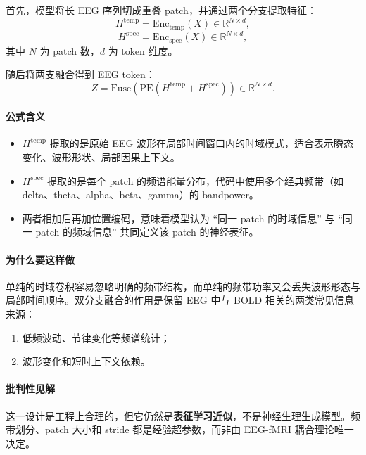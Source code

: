 \documentclass[11pt,a4paper]{ctexart}
\newcommand{\R}{\mathbb{R}}
\begin{document}
首先，模型将长 EEG 序列切成重叠 patch，并通过两个分支提取特征：
\begin{equation}
H^{\mathrm{temp}} = \mathrm{Enc}_{\mathrm{temp}}(X) \in \R^{N \times d},
\end{equation}
\begin{equation}
H^{\mathrm{spec}} = \mathrm{Enc}_{\mathrm{spec}}(X) \in \R^{N \times d},
\end{equation}
其中 $N$ 为 patch 数，$d$ 为 token 维度。

随后将两支融合得到 EEG token：
\begin{equation}
Z = \mathrm{Fuse}\!\left(\mathrm{PE}\!\left(H^{\mathrm{temp}} + H^{\mathrm{spec}}\right)\right)
\in \R^{N \times d}.
\end{equation}

\paragraph{公式含义}
\begin{itemize}
  \item $H^{\mathrm{temp}}$ 提取的是原始 EEG 波形在局部时间窗口内的时域模式，适合表示瞬态变化、波形形状、局部因果上下文。
  \item $H^{\mathrm{spec}}$ 提取的是每个 patch 的频谱能量分布，代码中使用多个经典频带（如 delta、theta、alpha、beta、gamma）的 bandpower。
  \item 两者相加后再加位置编码，意味着模型认为 ``同一 patch 的时域信息'' 与 ``同一 patch 的频域信息'' 共同定义该 patch 的神经表征。
\end{itemize}

\paragraph{为什么要这样做}
单纯的时域卷积容易忽略明确的频带结构，而单纯的频带功率又会丢失波形形态与局部时间顺序。双分支融合的作用是保留 EEG 中与 BOLD 相关的两类常见信息来源：
\begin{enumerate}
  \item 低频波动、节律变化等频谱统计；
  \item 波形变化和短时上下文依赖。
\end{enumerate}

\paragraph{批判性见解}
这一设计是工程上合理的，但它仍然是\textbf{表征学习近似}，不是神经生理生成模型。频带划分、patch 大小和 stride 都是经验超参数，而非由 EEG-fMRI 耦合理论唯一决定。
\end{document}

